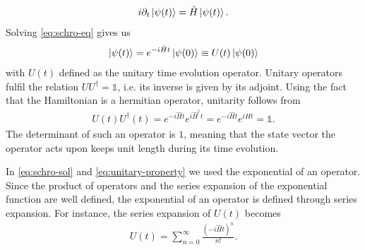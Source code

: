 \documentclass{book}
\numberwithin{equation}{section} %
\begin{document}
\begin{align}\label{eq:schro-eq}
    i\partial_t \ket{\psi(t)} = \hat{H} \ket{\psi(t)}.
\end{align}
Solving \cref{eq:schro-eq} gives us
\begin{align}\label{eq:schro-sol}
    \ket{\psi(t)} = e^{-i\hat{H}t}\ket{\psi(0)} \equiv U(t)\ket{\psi(0)}
\end{align}
with $U(t)$ defined as the unitary time evolution operator. Unitary operators fulfil the relation $UU^\dagger=\mathds{1}$, i.e.
its inverse is given by its adjoint. Using the fact that the Hamiltonian is a hermitian operator, unitarity follows from 
\begin{align}\label{eq:unitary-property}
    U(t)U^\dagger(t) = e^{-i\hat{H}t}e^{i\hat{H}^\dagger t} = e^{-i\hat{H}t}e^{i\hat{H}t} = \mathds{1}.
\end{align}
The determinant of such an operator is $1$, meaning that
the state vector the operator acts upon keeps unit length during its time evolution.
\par
In \cref{eq:schro-sol} and \cref{eq:unitary-property} we used the exponential of an operator. Since the
product of operators and
the series expansion of the exponential function are well defined, the exponential of an operator is defined through series expansion.
For instance, the series expansion of $U(t)$ becomes
\begin{align}\label{eq:matrix-exp}
    U(t) = \sum\limits_{n=0}^\infty \frac{(-i\hat{H}t)^n}{n!}.
\end{align}
\end{document}
